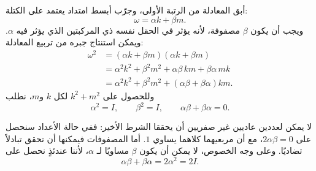 أبق المعادلة من الرتبة الأولى، وجرّب أبسط امتداد يعتمد على الكتلة:
\begin{equation}
\omega=\alpha k+\beta m.
\end{equation}
ويجب أن يكون \(\beta\) مصفوفة، لأنه يؤثر في الحقل نفسه ذي المركبتين الذي يؤثر فيه \(\alpha\). ويمكن استنتاج جبره من تربيع المعادلة:
\begin{align}
\omega^2
&=(\alpha k+\beta m)(\alpha k+\beta m)\\
&=\alpha^2k^2+\beta^2m^2
+\alpha\beta\,km+\beta\alpha\,mk\\
&=\alpha^2k^2+\beta^2m^2
+(\alpha\beta+\beta\alpha)km.
\end{align}
وللحصول على \(k^2+m^2\) لكل \(k\) و\(m\)، نطلب
\begin{equation}
\alpha^2=I,
\qquad
\beta^2=I,
\qquad
\alpha\beta+\beta\alpha=0.
\end{equation}

لا يمكن لعددين عاديين غير صفريين أن يحققا الشرط الأخير: ففي حالة الأعداد سنحصل على \(2\alpha\beta=0\)، مع أن مربعيهما كلاهما يساوي \(1\). أما المصفوفات فيمكنها أن تحقق تبادلاً تضاديًا. وعلى وجه الخصوص، لا يمكن أن يكون \(\beta\) مساويًا لـ \(\alpha\)، لأننا عندئذٍ نحصل على
\begin{equation}
\alpha\beta+\beta\alpha=2\alpha^2=2I.
\end{equation}


